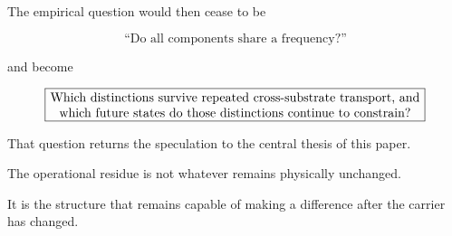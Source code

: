 \documentclass[11pt]{article}
\begin{document}
The empirical question would then cease to be

\[
\text{``Do all components share a frequency?''}
\]

and become

\[
\boxed{
\parbox{0.85\textwidth}{\centering
Which distinctions survive repeated cross-substrate transport,
and which future states do those distinctions continue to constrain?}
}
\]

That question returns the speculation to the central thesis of this paper.

The operational residue is not whatever remains physically unchanged.

It is the structure that remains capable of making a difference after the carrier has changed.

\newpage
\end{document}
